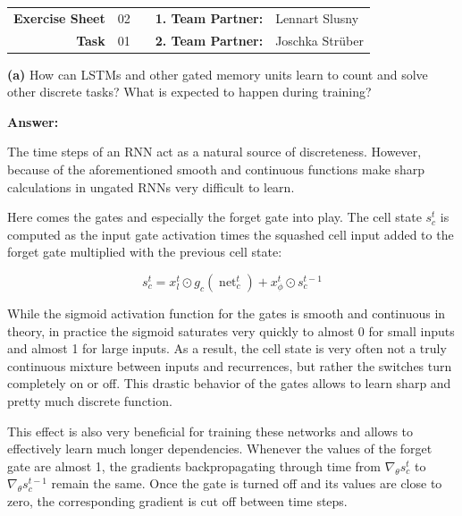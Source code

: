 
\newcommand{\obenlinks}{Recurrent and Generative Artificial Neural Networks}

\begin{center}
	\begin{tabular}{|rlp{4cm}rl|}
	\hline
	 \textbf{Exercise Sheet} & 02  &  & \textbf{1. Team Partner:} & Lennart Slusny  \\
	 \textbf{Task} & 01 & & \textbf{2. Team Partner:} & Joschka Strüber \\ \hline
	\end{tabular}
\end{center} 

\textbf{(a)} How can LSTMs and other gated memory units learn to count and solve other discrete tasks? What is expected to happen during training?

\textbf{Answer:} 

The time steps of an RNN act as a natural source of discreteness. However, because of the aforementioned smooth and continuous functions make sharp calculations in ungated RNNs very difficult to learn.

Here comes the gates and especially the forget gate into play. The cell state $s^t_c$ is computed as the input gate activation times the squashed cell input added to the forget gate multiplied with the previous cell state:

\begin{equation}
	s_c^t = x_l^t \odot g_c(\operatorname{net}_c^t) + x_{\phi}^t \odot s_c^{t-1}
\end{equation}

While the sigmoid activation function for the gates is smooth and continuous in theory, in practice the sigmoid saturates very quickly to almost 0 for small inputs and almost 1 for large inputs. As a result, the cell state is very often not a truly continuous mixture between inputs and recurrences, but rather the switches turn completely on or off. This drastic behavior of the gates allows to learn sharp and pretty much discrete function.

This effect is also very beneficial for training these networks and allows to effectively learn much longer dependencies. Whenever the values of the forget gate are almost 1, the gradients backpropagating through time from $\nabla_{\theta} s_c^t$ to $\nabla_{\theta} s_c^{t-1}$ remain the same. Once the gate is turned off and its values are close to zero, the corresponding gradient is cut off between time steps.

